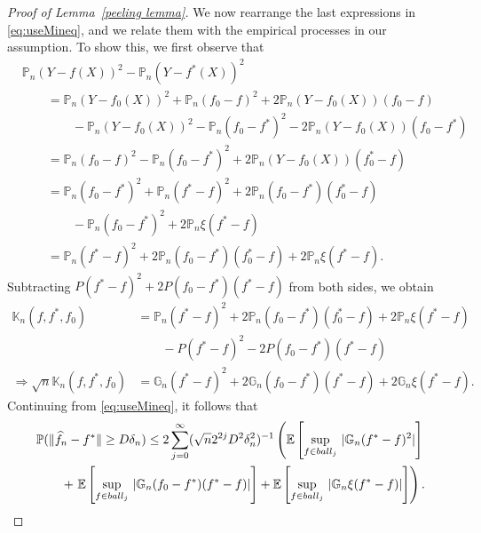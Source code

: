 \documentclass[12pt]{article}
\begin{document}
\begin{appendices}
\begin{proof}[Proof of Lemma~\ref{peeling lemma}]
We now rearrange the last expressions in \eqref{eq:useMineq}, and we relate them with the empirical processes in our assumption. To show this, we first observe that 
\begin{equation}
    \begin{aligned}\nonumber
    &\mathbb{P}_n(Y- f(X))^2 - \mathbb{P}_n(Y- f^*(X))^2\\
    &\qquad= \mathbb{P}_n(Y-f_0(X))^2 +  \mathbb{P}_n(f_0 - f)^2 + 2\mathbb{P}_n(Y - f_0(X))(f_0 - f)\\
    &\qquad \qquad - \mathbb{P}_n(Y-f_0(X))^2 - \mathbb{P}_n(f_0 - f^*)^2 - 2\mathbb{P}_n(Y-f_0(X))(f_0 - f^*)\\
    & \qquad= \mathbb{P}_n(f_0 - f)^2- \mathbb{P}_n(f_0 - f^*)^2 +2\mathbb{P}_n(Y-f_0(X))(f^*_0 - f)\\
    &\qquad = \mathbb{P}_n(f_0 - f^*)^2 + \mathbb{P}_n(f^* - f)^2  +2\mathbb{P}_n(f_0-f^*)(f^*_0 - f)\\
    &\qquad\qquad - \mathbb{P}_n(f_0 - f^*)^2 + 2\mathbb{P}_n\xi(f^*- f)\\
    &\qquad = \mathbb{P}_n(f^* - f)^2 +2\mathbb{P}_n(f_0-f^*)(f^*_0 - f)+ 2\mathbb{P}_n\xi(f^* - f).
    \end{aligned}
\end{equation}
Subtracting $P(f^* - f)^2 + 2P(f_0 - f^*)(f^* - f)$ from both sides, we obtain
\begin{equation}
\begin{aligned}\nonumber
    \mathbb{K}_n(f, f^*, f_0) 
    &= \mathbb{P}_n(f^* - f)^2 +2\mathbb{P}_n(f_0-f^*)(f^*_0 - f)+ 2\mathbb{P}_n\xi(f^* - f)\\
   &\qquad - P(f^* - f)^2 - 2P(f_0 - f^*)(f^* - f)\\
   \Longrightarrow  \sqrt{n}\mathbb{K}_n(f, f^*, f_0) 
   &= \mathbb{G}_n(f^* - f)^2 + 2\mathbb{G}_n(f_0 - f^*)(f^* - f) + 2\mathbb{G}_n\xi(f^* - f).
\end{aligned}
\end{equation}
Continuing from \eqref{eq:useMineq}, it follows that
\begin{equation}
\label{eq:notcleanempiricalp}
\begin{aligned}
    &\mathbb{P}(\|\widehat f_n - f^*\|\geq D\delta_n) \leq 2\sum_{j=0}^{\infty}(\sqrt{n}2^{2j}D^2\delta_n^2)^{-1}\left( \mathbb{E}\left[\sup_{ f\in {\rm ball}_j}\, |\mathbb{G}_n(f^* - f)^2|\right]\right.\\ & \qquad +\left.\mathbb{E}\left[\sup_{ f\in {\rm ball}_j} \,|\mathbb{G}_n(f_0 - f^*)(f^* - f)|\right]  + \mathbb{E}\left[\sup_{ f\in {\rm ball}_j}\, |\mathbb{G}_n\xi(f^* - f)|\right] \right).

\end{aligned}
\end{equation}
\end{proof}
\end{appendices}
\end{document}
